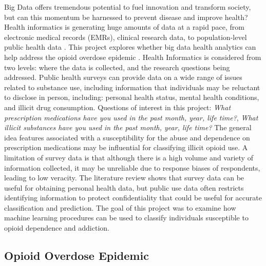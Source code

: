 \documentclass[sigconf]{acmart}
\begin{document}
Big Data offers tremendous potential to fuel innovation and transform society, 
but can this momentum be harnessed to prevent disease and improve health? 
Health informatics is generating huge amounts of data at a rapid pace, from 
electronic medical records (EMRs), clinical research data, to population-level 
public health data \cite{herland14}. This project explores whether big data 
health analytics can help address the opioid overdose epidemic \cite{cdc16}. 
Health Informatics is considered from two levels: where the data is collected, 
and the research questions being addressed. Public health surveys can provide 
data on a wide range of issues related to substance use, including information 
that individuals may be reluctant to disclose in person, including: personal 
health status, mental health conditions, and illicit drug consumption. Questions 
of interest in this project: \textit{What prescription medications have you used
in the past month, year, life time?}, \textit{What illicit substances have you 
used in the past month, year, life time?} The general idea features associated 
with a susceptibility for the abuse and dependence on prescription medications 
may be influential for classifying illicit opioid use. A limitation of survey 
data is that although there is a high volume and variety of information 
collected, it may be unreliable due to response biases of respondents, leading 
to low veracity. The literature review shows that survey data can be useful for 
obtaining personal health data, but public use data often restricts identifying 
information to protect confidentiality that could be useful for accurate 
classification and prediction. The goal of this project was to examine how 
machine learning procedures can be used to classify individuals susceptible 
to opioid dependence and addiction.

\subsection{Opioid Overdose Epidemic}
\end{document}
